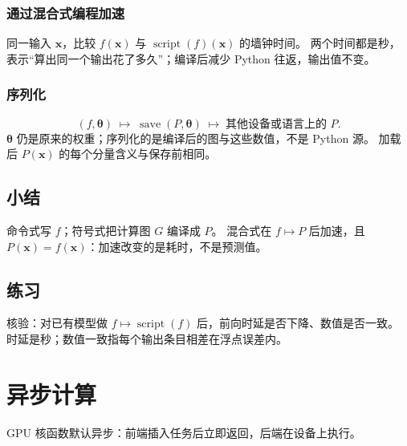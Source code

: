 \subsubsection{通过混合式编程加速}

同一输入 $\bm{x}$，比较 $f(\bm{x})$ 与 $\operatorname{script}(f)(\bm{x})$ 的墙钟时间。
两个时间都是秒，表示“算出同一个输出花了多久”；编译后减少 Python 往返，输出值不变。

\subsubsection{序列化}

\[
(f,\bm{\theta})
\;\longmapsto\;
\operatorname{save}(P,\bm{\theta})
\;\longmapsto\;
\text{其他设备或语言上的 }P.
\]
$\bm{\theta}$ 仍是原来的权重；序列化的是编译后的图与这些数值，不是 Python 源。
加载后 $P(\bm{x})$ 的每个分量含义与保存前相同。

\subsection{小结}

命令式写 $f$；符号式把计算图 $G$ 编译成 $P$。
混合式在 $f\mapsto P$ 后加速，且 $P(\bm{x})=f(\bm{x})$：加速改变的是耗时，不是预测值。

\subsection{练习}

核验：对已有模型做 $f\mapsto\operatorname{script}(f)$ 后，前向时延是否下降、数值是否一致。
时延是秒；数值一致指每个输出条目相差在浮点误差内。

\section{异步计算}





GPU 核函数默认异步：前端插入任务后立即返回，后端在设备上执行。


